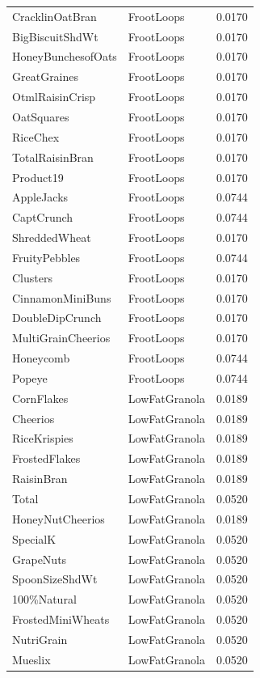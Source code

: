 \begin{table}[!htbp]
\begin{tabular}{lll}
\\
CracklinOatBran & FrootLoops & 0.0170
\\
BigBiscuitShdWt & FrootLoops & 0.0170
\\
HoneyBunchesofOats & FrootLoops & 0.0170
\\
GreatGraines & FrootLoops & 0.0170
\\
OtmlRaisinCrisp & FrootLoops & 0.0170
\\
OatSquares & FrootLoops & 0.0170
\\
RiceChex & FrootLoops & 0.0170
\\
TotalRaisinBran & FrootLoops & 0.0170
\\
Product19 & FrootLoops & 0.0170
\\
AppleJacks & FrootLoops & 0.0744
\\
CaptCrunch & FrootLoops & 0.0744
\\
ShreddedWheat & FrootLoops & 0.0170
\\
FruityPebbles & FrootLoops & 0.0744
\\
Clusters & FrootLoops & 0.0170
\\
CinnamonMiniBuns & FrootLoops & 0.0170
\\
DoubleDipCrunch & FrootLoops & 0.0170
\\
MultiGrainCheerios & FrootLoops & 0.0170
\\
Honeycomb & FrootLoops & 0.0744
\\
Popeye & FrootLoops & 0.0744
\\
CornFlakes & LowFatGranola & 0.0189
\\
Cheerios & LowFatGranola & 0.0189
\\
RiceKrispies & LowFatGranola & 0.0189
\\
FrostedFlakes & LowFatGranola & 0.0189
\\
RaisinBran & LowFatGranola & 0.0189
\\
Total & LowFatGranola & 0.0520
\\
HoneyNutCheerios & LowFatGranola & 0.0189
\\
SpecialK & LowFatGranola & 0.0520
\\
GrapeNuts & LowFatGranola & 0.0520
\\
SpoonSizeShdWt & LowFatGranola & 0.0520
\\
100\%Natural & LowFatGranola & 0.0520
\\
FrostedMiniWheats & LowFatGranola & 0.0520
\\
NutriGrain & LowFatGranola & 0.0520
\\
Mueslix & LowFatGranola & 0.0520

\end{tabular}
\end{table}
